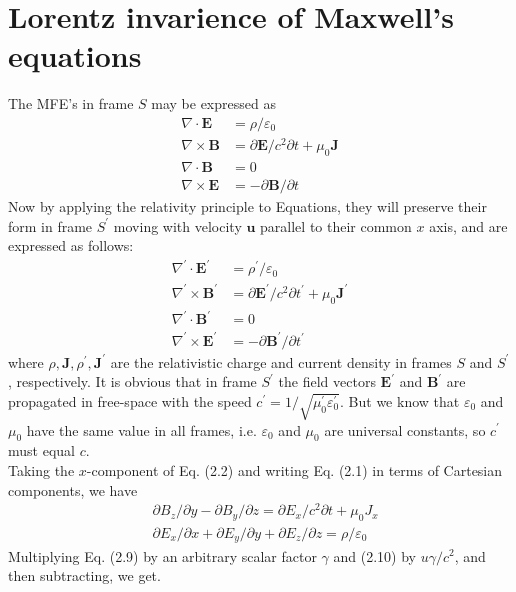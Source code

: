 \section{Lorentz invarience of Maxwell's equations}
The MFE's in frame $S$ may be expressed as
\begin{align}
\nabla \cdot \mathbf{E}&=\rho / \varepsilon_{0}\\
\nabla \times \mathbf{B}&=\partial \mathbf{E} / c^{2} \partial t+\mu_{0} \mathbf{J}\\
\nabla \cdot \mathbf{B}&=0\\
\nabla \times \mathbf{E}&=-\partial \mathbf{B} / \partial t
\end{align}
  Now by applying the relativity principle to Equations, they will preserve their form in frame $S^{\prime}$ moving with velocity $\mathbf{u}$ parallel to their common $x$ axis, and are expressed as follows:
\begin{align}
\nabla^{\prime} \cdot \mathbf{E}^{\prime}&=\rho^{\prime} / \varepsilon_{0}\\
\nabla^{\prime} \times \mathbf{B}^{\prime}&=\partial \mathbf{E}^{\prime} / c^{2} \partial t^{\prime}+\mu_{0} \mathbf{J}^{\prime}\\
\nabla^{\prime} \cdot \mathbf{B}^{\prime}&=0\\
\nabla^{\prime} \times \mathbf{E}^{\prime}&=-\partial \mathbf{B}^{\prime} / \partial t^{\prime}
\end{align}
where $\rho, \mathbf{J}, \rho^{\prime}, \mathbf{J}^{\prime}$ are the relativistic charge and current density in frames $S$ and $S^{\prime}$, respectively. It is obvious that in frame $S^{\prime}$ the field vectors $\mathbf{E}^{\prime}$ and $\mathbf{B}^{\prime}$ are propagated in free-space with the speed $c^{\prime}=1 / \sqrt{\mu_{0}^{\prime} \varepsilon_{0}^{\prime}}$. But we know that $\varepsilon_{0}$ and $\mu_{0}$ have the
same value in all frames, i.e. $\varepsilon_{0}$ and $\mu_{0}$ are universal constants, so $c^{\prime}$ must equal $c$.\\ 
 Taking the $x$-component of Eq. (2.2) and writing Eq. (2.1) in terms of Cartesian components, we have
\begin{align}
&\partial B_{z} / \partial y-\partial B_{y} / \partial z=\partial E_{x} / c^{2} \partial t+\mu_{0} J_{x} \\
&\partial E_{x} / \partial x+\partial E_{y} / \partial y+\partial E_{z} / \partial z=\rho / \varepsilon_{0}
\end{align}
Multiplying Eq. (2.9) by an arbitrary scalar factor $\gamma$ and (2.10) by $u \gamma / c^{2}$, and then subtracting, we get.
